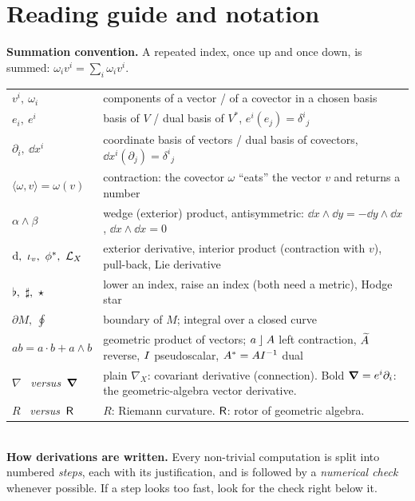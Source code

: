 \section*{Reading guide and notation}

\begin{keyidea}
\small
\textbf{Summation convention.} A repeated index, once up and once down, is summed:
$\omega_iv^i=\sum_i\omega_iv^i$.\\[2pt]
\begin{tabular}{@{}p{4.1cm}p{10.2cm}@{}}
$v^i,\ \omega_i$ & components of a vector / of a covector in a chosen basis\\
$e_i,\ e^i$ & basis of $V$ / dual basis of $V^*$, $e^i(e_j)=\delta^i{}_j$\\
$\partial_i,\ \dd x^i$ & coordinate basis of vectors / dual basis of covectors, $\dd x^i(\partial_j)=\delta^i{}_j$\\
$\langle\omega,v\rangle=\omega(v)$ & contraction: the covector $\omega$ ``eats'' the vector $v$ and returns a number\\
$\alpha\wedge\beta$ & wedge (exterior) product, antisymmetric: $\dd x\wedge\dd y=-\dd y\wedge\dd x$, $\dd x\wedge\dd x=0$\\
$\dd,\ \iota_v,\ \phi\pb,\ \Lie_X$ & exterior derivative, interior product (contraction with $v$), pull-back, Lie derivative\\
$\flat,\ \sharp,\ \hodge$ & lower an index, raise an index (both need a metric), Hodge star\\
$\partial M,\ \oint$ & boundary of $M$; integral over a closed curve\\
$ab=a\cdot b+a\wedge b$ & geometric product of vectors; $a\mathbin{\rfloor} A$ left contraction, $\widetilde{A}$ reverse, $I$ pseudoscalar, $A^{\ast}=AI^{-1}$ dual\\
$\nabla$ \ \textit{versus}\ $\boldsymbol{\nabla}$ & plain $\nabla_X$: covariant derivative (connection). Bold $\boldsymbol{\nabla}=e^i\partial_i$: the geometric-algebra vector derivative.\\
$R$ \ \textit{versus}\ $\mathsf{R}$ & $R$: Riemann curvature. $\mathsf{R}$: rotor of geometric algebra.
\end{tabular}\\[3pt]
\textbf{How derivations are written.} Every non-trivial computation is split into numbered
\emph{steps}, each with its justification, and is followed by a \emph{numerical check} whenever
possible. If a step looks too fast, look for the check right below it.
\end{keyidea}

